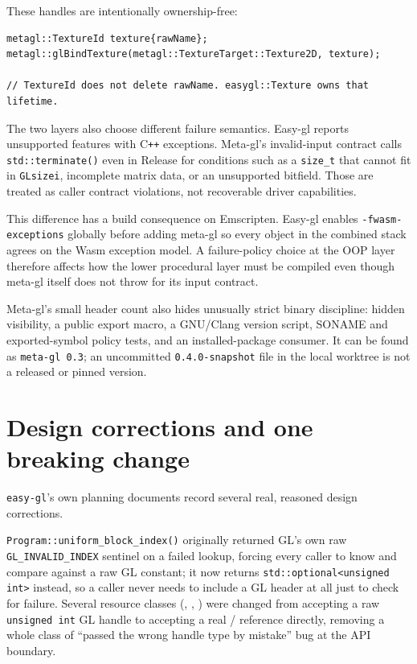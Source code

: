These handles are intentionally ownership-free:

\begin{lstlisting}
metagl::TextureId texture{rawName};
metagl::glBindTexture(metagl::TextureTarget::Texture2D, texture);

// TextureId does not delete rawName. easygl::Texture owns that lifetime.
\end{lstlisting}

The two layers also choose different failure semantics. Easy-gl reports unsupported features
with C\texttt{++} exceptions. Meta-gl's invalid-input contract calls
\texttt{std::terminate()} even in Release for conditions such as a \texttt{size\_t} that
cannot fit in \texttt{GLsizei}, incomplete matrix data, or an unsupported bitfield. Those are
treated as caller contract violations, not recoverable driver capabilities.

This difference has a build consequence on Emscripten. Easy-gl enables
\texttt{-fwasm-exceptions} globally before adding meta-gl so every object in the combined stack
agrees on the Wasm exception model. A failure-policy choice at the OOP layer therefore affects
how the lower procedural layer must be compiled even though meta-gl itself does not throw for
its input contract.

Meta-gl's small header count also hides unusually strict binary discipline: hidden visibility,
a public export macro, a GNU/Clang version script, SONAME and exported-symbol policy tests, and
an installed-package consumer. It can be found as \texttt{meta-gl 0.3}; an uncommitted
\texttt{0.4.0-snapshot} file in the local worktree is not a released or pinned version.

\section{Design corrections and one breaking change}

\texttt{easy-gl}'s own planning documents record several real, reasoned design corrections.

\texttt{Program::uniform\_block\_index()} originally returned GL's own raw
\texttt{GL\_INVALID\_INDEX} sentinel on a failed lookup, forcing every caller to know and
compare against a raw GL constant; it now returns \texttt{std::optional<unsigned int>}
instead, so a caller never needs to include a GL header at all just to check for failure.
Several resource classes (, ,
) were changed from accepting a raw \texttt{unsigned int} GL
handle to accepting a real  /  reference directly, removing
a whole class of ``passed the wrong handle type by mistake'' bug at the API boundary.

